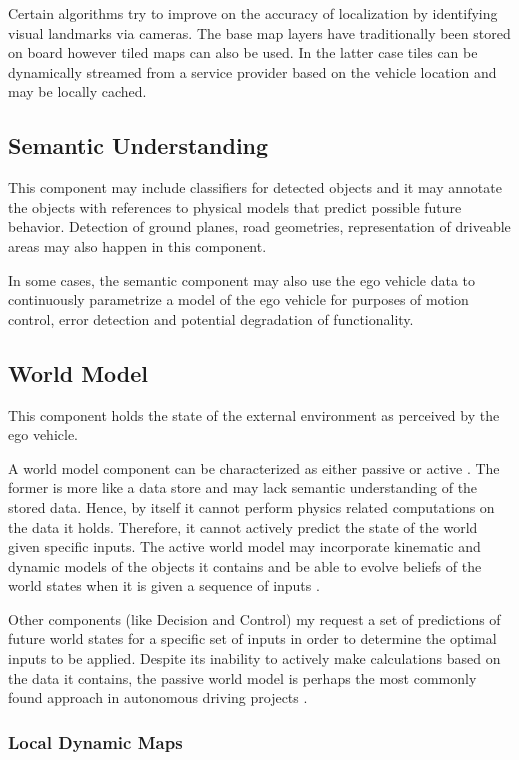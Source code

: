 Certain algorithms try to improve on the accuracy of localization by identifying visual landmarks via cameras. The base map layers have traditionally been stored on board however tiled maps can also be used. In the latter case tiles can be dynamically streamed from a service provider based on the vehicle location and may be locally cached.

\subsection{Semantic Understanding}
This component may include classifiers for detected objects and it may annotate the objects with references to physical models that predict possible future behavior. Detection of ground planes, road geometries, representation of driveable areas may also happen in this component.

In some cases, the semantic component may also use the ego vehicle data to continuously parametrize a model of the ego vehicle for purposes of motion control, error detection and potential degradation of functionality.

\subsection{World Model}
This component holds the state of the external environment as perceived by the ego vehicle.

A world model component can be characterized as either passive or active \cite{Bahere}. 
The former is more like a data store and may lack semantic understanding of the stored data. 
Hence, by itself it cannot perform physics related computations on the data it holds. 
Therefore, it cannot actively predict the state of the world given specific inputs. 
The active world model may incorporate kinematic and dynamic models of the objects it contains 
and be able to evolve beliefs of the world states when it is given a sequence of inputs \cite{Bahere}.

Other components (like Decision and Control) my request a set of predictions of future world states for a specific set of
inputs in order to determine the optimal inputs to be applied.
Despite its inability to actively make calculations based on the data it contains, the passive world model is perhaps the most commonly found approach in autonomous driving projects \cite{Bahere}. 


\subsubsection{Local Dynamic Maps}

